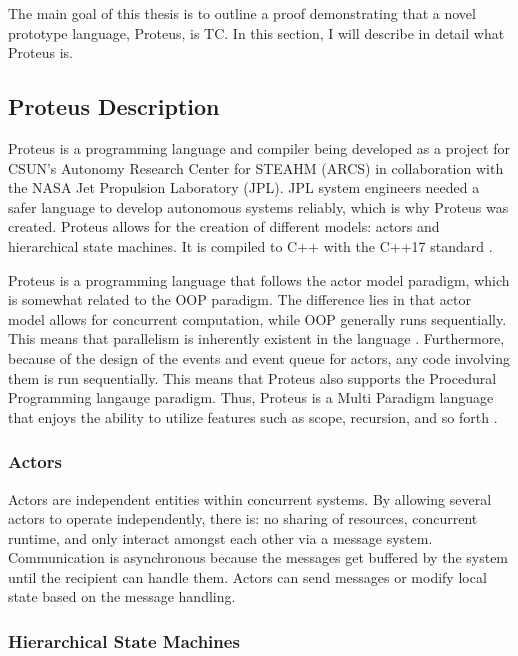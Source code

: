 The main goal of this thesis is to outline a proof demonstrating that a novel prototype language, Proteus, is TC.
In this section, I will describe in detail what Proteus is.

\subsection{Proteus Description}\label{subsec:ProteusDescription}

Proteus is a programming language and compiler being developed as a project for CSUN's Autonomy Research Center for STEAHM (ARCS) in collaboration with the NASA Jet Propulsion Laboratory (JPL).
JPL system engineers needed a safer language to develop autonomous systems reliably, which is why Proteus was created.
Proteus allows for the creation of different models: actors and hierarchical state machines.
It is compiled to C++ with the C++17 standard \cite{ProteusRunTime}.

Proteus is a programming language that follows the actor model paradigm, which is somewhat related to the OOP paradigm.
The difference lies in that actor model allows for concurrent computation, while OOP generally runs sequentially.
This means that parallelism is inherently existent in the language \cite{ActorModelParallel,ActorJavaParallel}.
Furthermore, because of the design of the events and event queue for actors, any code involving them is run sequentially.
This means that Proteus also supports the Procedural Programming langauge paradigm.
Thus, Proteus is a Multi Paradigm language that enjoys the ability to utilize features such as scope, recursion, and so forth \cite{ProteusPaper}.

\subsubsection{Actors}\label{subsubsec:Actors}

Actors are independent entities within concurrent systems.
By allowing several actors to operate independently, there is: no sharing of resources, concurrent runtime, and only interact amongst each other via a message system.
Communication is asynchronous because the messages get buffered by the system until the recipient can handle them.
Actors can send messages or modify local state based on the message handling.

\subsubsection{Hierarchical State Machines}\label{subsubsec:HSM}

